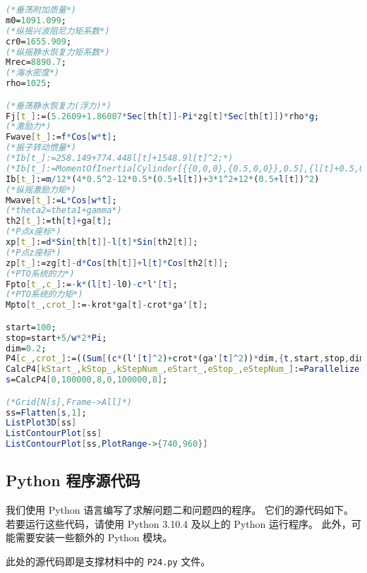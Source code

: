 \begin{lstlisting}[language=Mathematica,breaklines]
(*垂荡附加质量*)
m0=1091.099;
(*纵摇兴波阻尼力矩系数*)
cr0=1655.909;
(*纵摇静水恢复力矩系数*)
Mrec=8890.7;
(*海水密度*)
rho=1025;

(*垂荡静水恢复力(浮力)*)
Fj[t_]:=(5.2609+1.86007*Sec[th[t]]-Pi*zg[t]*Sec[th[t]])*rho*g;
(*激励力*)
Fwave[t_]:=f*Cos[w*t];
(*振子转动惯量*)
(*Ib[t_]:=258.149+774.448l[t]+1548.9l[t]^2;*)
(*Ib[t_]:=MomentOfInertia[Cylinder[{{0,0,0},{0.5,0,0}},0.5],{l[t]+0.5,0,0},{0,0,1}]*)
Ib[t_]:=m/12*(4*0.5^2-12*0.5*(0.5+l[t])+3*1^2+12*(0.5+l[t])^2)
(*纵摇激励力矩*)
Mwave[t_]:=L*Cos[w*t];
(*theta2=theta1+gamma*)
th2[t_]:=th[t]+ga[t];
(*P点x座标*)
xp[t_]:=d*Sin[th[t]]-l[t]*Sin[th2[t]];
(*P点z座标*)
zp[t_]:=zg[t]-d*Cos[th[t]]+l[t]*Cos[th2[t]];
(*PTO系统的力*)
Fpto[t_,c_]:=-k*(l[t]-l0)-c*l'[t];
(*PTO系统的力矩*)
Mpto[t_,crot_]:=-krot*ga[t]-crot*ga'[t];

start=100;
stop=start+5/w*2*Pi;
dim=0.2;
P4[c_,crot_]:=((Sum[(c*(l'[t]^2)+crot*(ga'[t]^2))*dim,{t,start,stop,dim}]/.NDSolve[{m*xp''[t]==-Fpto[t,c]*Sin[th2[t]]+Fab[t]*Cos[th2[t]],m*zp''[t]==Fpto[t,c]*Cos[th2[t]]-m*g+Fab[t]*Sin[th2[t]],Ib[t]*th2''[t]==Mpto[t,crot]+Fab[t]*l[t],M*zg''[t]==Fwave[t]+Fj[t]-M*g-Fpto[t,c]*Cos[th2[t]]-Fab[t]*Sin[th2[t]]-m0*zg''[t]-c0*zg'[t],Ia*th''[t]==Mwave[t]-Mpto[t,crot]+Fab[t]*d*Cos[th[t]]*Cos[th2[t]]-Fab[t]*d*Sin[th[t]]*Sin[th2[t]]-I0*th''[t]-cr0*th'[t]-Mrec*th[t],th'[0]==th[0]==ga[0]==ga'[0]==l'[0]==zg'[0]==0,l[0]==l0-m/k,zg[0]==0},{th,ga,zg,l},{t,start,stop}])/(stop-start))
CalcP4[kStart_,kStop_,kStepNum_,eStart_,eStop_,eStepNum_]:=Parallelize[Table[{pe,ppk,First[P4[ppk,pe]]},{ppk,Range[kStart,kStop,(kStop-kStart)/kStepNum]},{pe,Range[eStart,eStop,(eStop-eStart)/eStepNum]}]]
s=CalcP4[0,100000,8,0,100000,8];

(*Grid[N[s],Frame->All]*)
ss=Flatten[s,1];
ListPlot3D[ss]
ListContourPlot[ss]
ListContourPlot[ss,PlotRange->{740,960}]    
\end{lstlisting}

\subsection{Python 程序源代码}

我们使用 Python 语言编写了求解问题二和问题四的程序。
它们的源代码如下。
若要运行这些代码，请使用 Python 3.10.4 及以上的 Python 运行程序。
此外，可能需要安装一些额外的 Python 模块。

此处的源代码即是支撑材料中的 \verb|P24.py| 文件。


